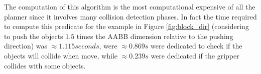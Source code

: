 The computation of this algorithm is the most computational expensive of all the planner since it involves many collision detection phases. In fact the time required to compute this predicate for the example in Figure \ref{fig:block_dir} (considering to push the objects $1.5$ times the AABB dimension relative to the pushing direction) was $\approx 1.115 seconds$, were $\approx 0.869s$ were dedicated to check if the objects will collide when move, while $\approx 0.239s$ were dedicated if the gripper collides with some objects.  

